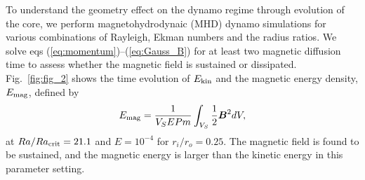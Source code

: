 {\color{red}
To understand the geometry effect on the dynamo regime through evolution of the core, we perform magnetohydrodynaic (MHD) dynamo simulations for various combinations of Rayleigh, Ekman numbers and the radius ratios.
We solve eqs (\ref{eq:momentum})--(\ref{eq:Gauss_B}) for at least two magnetic diffusion time to assess whether the magnetic field is sustained or dissipated.
}
{\color{red}
Fig.~\ref{fig:fig_2} shows the time evolution of $E_{\rm kin}$ and the magnetic energy density, $E_{\rm mag}$, defined by
%
\begin{equation}
E_{\rm mag} = \frac{1}{V_{S}E Pm} \int_{V_{S}} \frac{1}{2} \mbox{\boldmath$B$}^{2} dV,
\label{eq:magnetic_energy}
\end{equation}
%
at $Ra/Ra_{\rm crit} = 21.1$ and $E = 10^{-4}$ for $r_i/r_o = 0.25$.
}
%
% 
%
{\color{red}
The magnetic field is found to be sustained, and the magnetic energy is larger than the kinetic energy in this parameter setting.
}









